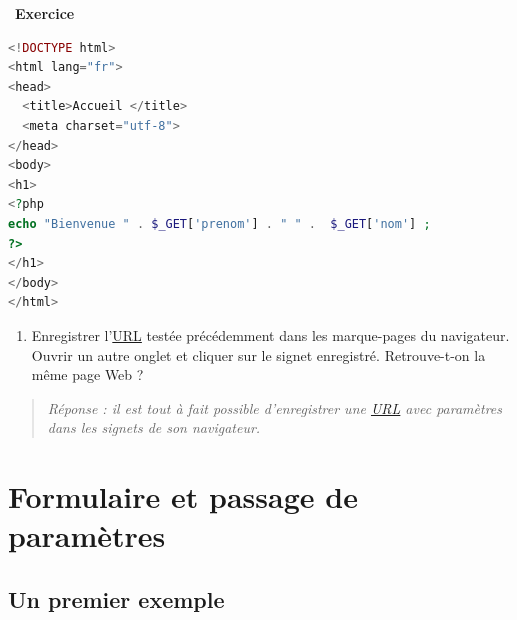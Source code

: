 \documentclass[
  11pt,
]{article}
\providecommand{\tightlist}{%
  \setlength{\itemsep}{0pt}\setlength{\parskip}{0pt}}
\newcounter{exo}
\newenvironment{exercice}[1]
{\par \medskip   \addtocounter{exo}{1} \noindent  
\begin{bclogo}[arrondi =0.1,   noborder = true, logo=\bccrayon, marge=4]{~\textbf{Exercice} \textbf{\theexo} {\itshape #1} }  \par}
{
\end{bclogo}
 \par \bigskip }
\newcounter{rque}
\newcounter{def}
\begin{document}
\begin{exercice}{}
\begin{lstlisting}[language=PHP]
 <!DOCTYPE html>
<html lang="fr">
<head>
  <title>Accueil </title>
  <meta charset="utf-8">    
</head> 
<body>
<h1>
<?php  
echo "Bienvenue " . $_GET['prenom'] . " " .  $_GET['nom'] ;
?>
</h1>
</body>
</html> 
\end{lstlisting}

\begin{enumerate}
\def\labelenumi{\arabic{enumi}.}
\setcounter{enumi}{3}
\tightlist
\item
  Enregistrer
  l'\href{https://developer.mozilla.org/fr/docs/Glossaire/URL}{URL}
  testée précédemment dans les marque-pages du navigateur. Ouvrir un
  autre onglet et cliquer sur le signet enregistré. Retrouve-t-on la
  même page Web ?
\end{enumerate}

\begin{quote}
\emph{Réponse : il est tout à fait possible d'enregistrer une
\href{https://developer.mozilla.org/fr/docs/Glossaire/URL}{URL} avec
paramètres dans les signets de son navigateur.}
\end{quote}

\end{exercice}

\hypertarget{formulaire-et-passage-de-paramuxe8tres}{%
\section{Formulaire et passage de
paramètres}\label{formulaire-et-passage-de-paramuxe8tres}}

\hypertarget{un-premier-exemple}{%
\subsection{Un premier exemple}\label{un-premier-exemple}}
\end{document}

